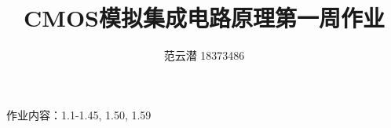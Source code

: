 \documentclass[lang=cn,11pt,a4paper,cite=authoryear]{elegantpaper}
\title{CMOS模拟集成电路原理\quad 第一周作业}
\author{范云潜 18373486}
\institute{微电子学院 184111 班}
\date{\zhtoday}
\begin{document}
\maketitle

作业内容：1.1-1.45, 1.50, 1.59





\end{document}
